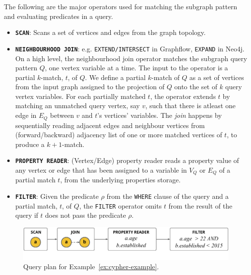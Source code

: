The following are the major operators used for matching the subgraph pattern and evaluating predicates in a query.


\begin{itemize}
	
	\item \textbf{\texttt{SCAN}}: Scans a set of vertices and edges from the graph topology.
	
	\item \textbf{\texttt{NEIGHBOURHOOD JOIN}}: e.g. \texttt{EXTEND/INTERSECT} in Graphflow, \texttt{EXPAND} in Neo4j. On a high level, the neighbourhood join operator matches the subgraph query pattern $Q$, one vertex variable at a time. The input to the operator is a partial $k$-match, $t$, of $Q$. We define a partial $k$-match of $Q$ as a set of vertices from the input graph assigned to the projection of $Q$ onto the set of $k$ query vertex variables. For each partially matched $t$, the operator extends $t$ by matching an unmatched query vertex, say $v$, such that there is atleast one edge in $E_Q$ between $v$ and $t$'s vertices' variables. The \emph{join} happens by sequentially reading adjacent edges and neighbour vertices from (forward/backward) adjacency list of one or more matched vertices of $t$, to produce a $k+1$-match.

	\item \textbf{\texttt{PROPERTY READER}}: (Vertex/Edge) property reader reads a property value of any vertex or edge that has been assigned to a variable in $V_Q$ or $E_Q$ of a partial match $t$, from the underlying properties storage. 

	\item \textbf{\texttt{FILTER}}: Given the predicate $\rho$ from the \texttt{WHERE} clause of the query and a partial match, $t$, of $Q$, the \texttt{FILTER} operator omits $t$ from the result of the query if $t$ does not pass the predicate $\rho$.
	
\end{itemize}

\begin{figure}
	\hfill\includegraphics[scale=0.80]{img/ex-qp}\hfill
	\vspace{-8pt}
	\caption{Query plan for Example~\ref{ex:cypher-example}.}
	\label{fig:ex-qp}
	\vspace{-8pt}
\end{figure}

